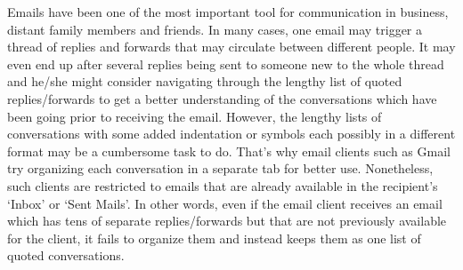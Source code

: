 \documentclass[11pt]{article}
\begin{document}
\begin{figure}[tb]
\end{figure}

Emails have been one of the most important tool for communication in business, distant family members and friends.
In many cases, one email may trigger a thread of replies and forwards that may circulate between different people. It may even
end up after several replies being sent to someone new to the whole thread and he/she might consider navigating through
the lengthy list of quoted replies/forwards to get a better understanding of the conversations which have been going prior to 
receiving the email. However, the lengthy lists of conversations with some added indentation or symbols each possibly in a different
format may be a cumbersome task to do. That's why email clients such as Gmail try organizing each conversation in a separate tab for
better use. Nonetheless, such clients are restricted to emails that are already available in the recipient's `Inbox' or `Sent Mails'.
In other words, even if the email client receives an email which has 
tens of separate replies/forwards but that are not previously available for the client, it 
fails to organize them and instead keeps them as one list of quoted conversations.
\end{document}
